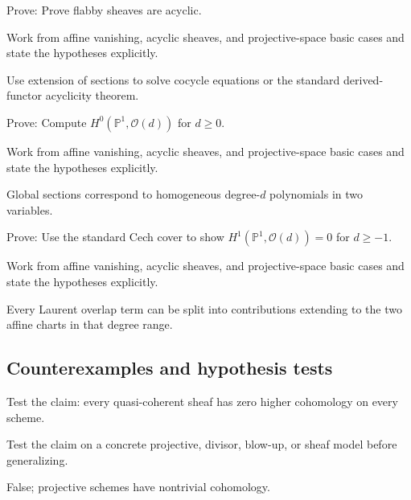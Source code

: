 \begin{exercise}\label{exr:vi49-expand-07}
Prove: Prove flabby sheaves are acyclic.
\end{exercise}
\begin{hint}
Work from affine vanishing, acyclic sheaves, and projective-space basic cases and state the hypotheses explicitly.
\end{hint}
\begin{solution}
Use extension of sections to solve cocycle equations or the standard derived-functor acyclicity theorem.
\end{solution}

\begin{exercise}\label{exr:vi49-expand-08}
Prove: Compute $H^0(\mathbb P^1,\mathcal O(d))$ for $d\ge0$.
\end{exercise}
\begin{hint}
Work from affine vanishing, acyclic sheaves, and projective-space basic cases and state the hypotheses explicitly.
\end{hint}
\begin{solution}
Global sections correspond to homogeneous degree-$d$ polynomials in two variables.
\end{solution}

\begin{exercise}\label{exr:vi49-expand-09}
Prove: Use the standard Cech cover to show $H^1(\mathbb P^1,\mathcal O(d))=0$ for $d\ge-1$.
\end{exercise}
\begin{hint}
Work from affine vanishing, acyclic sheaves, and projective-space basic cases and state the hypotheses explicitly.
\end{hint}
\begin{solution}
Every Laurent overlap term can be split into contributions extending to the two affine charts in that degree range.
\end{solution}

\subsection*{Counterexamples and hypothesis tests}

\begin{exercise}\label{exr:vi49-expand-10}
Test the claim: every quasi-coherent sheaf has zero higher cohomology on every scheme.
\end{exercise}
\begin{hint}
Test the claim on a concrete projective, divisor, blow-up, or sheaf model before generalizing.
\end{hint}
\begin{solution}
False; projective schemes have nontrivial cohomology.
\end{solution}

